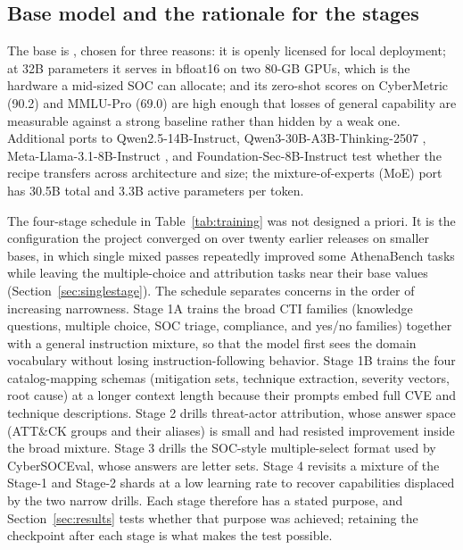 \documentclass[a4paper,fleqn]{cas-dc}
\newcommand{\code}[1]{\path{#1}}
\begin{document}
\subsection{Base model and the rationale for the stages}
The base is \code{Qwen/Qwen2.5-32B-Instruct} \citep{qwen2025qwen25}, chosen for three reasons: it is openly licensed for local deployment; at 32B parameters it serves in bfloat16 on two 80-GB GPUs, which is the hardware a mid-sized SOC can allocate; and its zero-shot scores on CyberMetric (90.2) and MMLU-Pro (69.0) are high enough that losses of general capability are measurable against a strong baseline rather than hidden by a weak one. Additional ports to Qwen2.5-14B-Instruct, Qwen3-30B-A3B-Thinking-2507 \citep{yang2025qwen3}, Meta-Llama-3.1-8B-Instruct \citep{grattafiori2024llama3}, and Foundation-Sec-8B-Instruct \citep{kassianik2025foundationsec} test whether the recipe transfers across architecture and size; the mixture-of-experts (MoE) port has 30.5B total and 3.3B active parameters per token.

The four-stage schedule in Table~\ref{tab:training} was not designed a priori. It is the configuration the project converged on over twenty earlier releases on smaller bases, in which single mixed passes repeatedly improved some AthenaBench tasks while leaving the multiple-choice and attribution tasks near their base values (Section~\ref{sec:singlestage}). The schedule separates concerns in the order of increasing narrowness. Stage 1A trains the broad CTI families (knowledge questions, multiple choice, SOC triage, compliance, and yes/no families) together with a general instruction mixture, so that the model first sees the domain vocabulary without losing instruction-following behavior. Stage 1B trains the four catalog-mapping schemas (mitigation sets, technique extraction, severity vectors, root cause) at a longer context length because their prompts embed full CVE and technique descriptions. Stage 2 drills threat-actor attribution, whose answer space (ATT\&CK groups and their aliases) is small and had resisted improvement inside the broad mixture. Stage 3 drills the SOC-style multiple-select format used by CyberSOCEval, whose answers are letter sets. Stage 4 revisits a mixture of the Stage-1 and Stage-2 shards at a low learning rate to recover capabilities displaced by the two narrow drills. Each stage therefore has a stated purpose, and Section~\ref{sec:results} tests whether that purpose was achieved; retaining the checkpoint after each stage is what makes the test possible.
\end{document}
